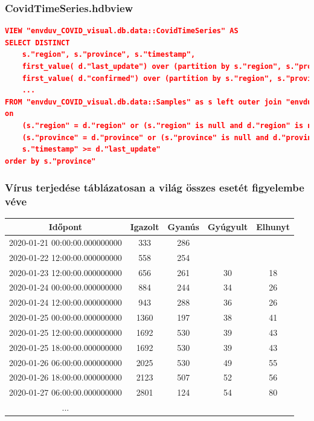 \documentclass[12pt,a4papaer]{article}
\begin{document}
    \subsubsection{CovidTimeSeries.hdbview}
    \begin{lstlisting}[language=json]
VIEW "envduv_COVID_visual.db.data::CovidTimeSeries" AS
SELECT DISTINCT
	s."region", s."province", s."timestamp", 
	first_value( d."last_update") over (partition by s."region", s."province", s."timestamp" order by d."last_update" desc) as "last_update",
    first_value( d."confirmed") over (partition by s."region", s."province", s."timestamp" order by d."last_update" desc) as "confirmed",
    ...
FROM "envduv_COVID_visual.db.data::Samples" as s left outer join "envduv_COVID_visual.db.data::Covid_raw" d
on 
	(s."region" = d."region" or (s."region" is null and d."region" is null)) and 
	(s."province" = d."province" or (s."province" is null and d."province" is null)) and 
	s."timestamp" >= d."last_update"
order by s."province"
    \end{lstlisting}

    \subsubsection{Vírus terjedése táblázatosan a világ összes esetét figyelembe véve}
    \begin{center}
        \begin{tabular}{|c c c c c|}
            \hline
            Időpont& Igazolt& Gyanús& Gyúgyult& Elhunyt \\
            \hline
            2020-01-21 00:00:00.000000000&333&286& & \\
            2020-01-22 12:00:00.000000000&558&254& & \\
            2020-01-23 12:00:00.000000000&656&261&30&18 \\
            2020-01-24 00:00:00.000000000&884&244&34&26 \\
            2020-01-24 12:00:00.000000000&943&288&36&26 \\
            2020-01-25 00:00:00.000000000&1360&197&38&41 \\
            2020-01-25 12:00:00.000000000&1692&530&39&43 \\
            2020-01-25 18:00:00.000000000&1692&530&39&43 \\
            2020-01-26 06:00:00.000000000&2025&530&49&55 \\
            2020-01-26 18:00:00.000000000&2123&507&52&56 \\
            2020-01-27 06:00:00.000000000&2801&124&54&80 \\
            ... \\
            \hline
        \end{tabular}
    \end{center}
\end{document}
